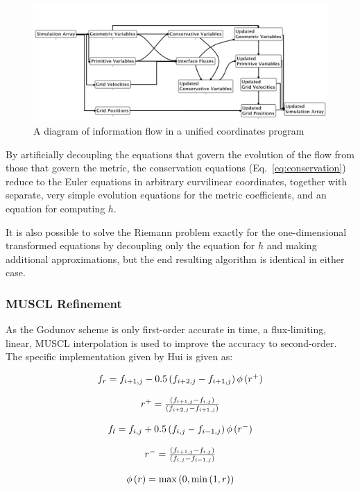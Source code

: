 \documentclass[12pt,letterpaper]{article}
\begin{document}
\begin{figure}[htbp]
\centering
\includegraphics[width=\textwidth]{SimulationFlow.pdf}
\caption[A Diagram of Information Flow in a Unified
CoordinatesProgram]{A diagram of information flow in a unified coordinates program}
\label{fig:simulationflow}
\end{figure}

By artificially decoupling the equations that govern the evolution of the flow from those that govern the metric, the conservation equations (Eq.~\ref{eq:conservation}) reduce to the Euler equations in arbitrary curvilinear coordinates, together with separate, very simple evolution equations for the metric coefficients, and an equation for computing $h$. 

It is also possible to solve the Riemann problem exactly for the one-dimensional transformed equations by decoupling only the equation for $h$ and making additional approximations\cite{hui01}, but the end resulting algorithm is identical in either case.

\subsubsection{MUSCL Refinement}

As the Godunov scheme is only first-order accurate in time, a
flux-limiting, linear, MUSCL interpolation is used to improve the
accuracy to second-order.\cite{toro99} The specific
implementation given by Hui \cite{hui99} is given as:

\begin{equation}
\label{eq:MUSCL}
\begin{array}{c}
f_r=f_{i+1,j}-0.5\left(f_{i+2,j}-f_{i+1,j}\right)\phi\left(r^+\right)\bigskip\\
r^+=\frac{\left(f_{i+1,j}-f_{i,j}\right)}{\left(f_{i+2,j}-f_{i+1,j}\right)}\bigskip\\
f_l=f_{i,j}+0.5\left(f_{i,j}-f_{i-1,j}\right)\phi\left(r^-\right)\bigskip\\
r^-=\frac{\left(f_{i+1,j}-f_{i,j}\right)}{\left(f_{i,j}-f_{i-1,j}\right)}\bigskip\\
\phi\left(r\right)={\rm max}\left(0,{\rm min}\left(1,r\right)\right)
\end{array}
\end{equation}
\end{document}
